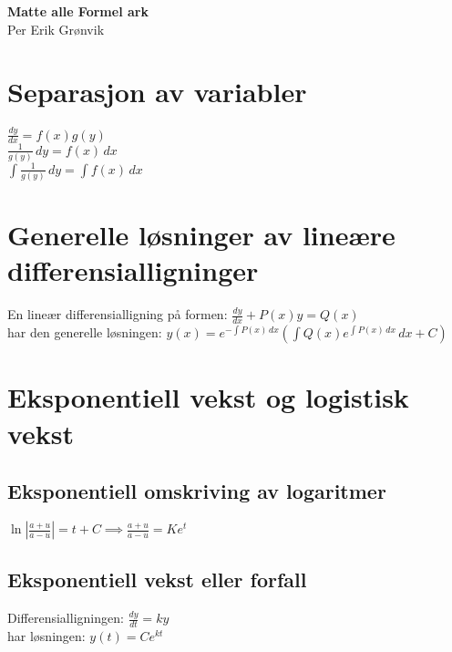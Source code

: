 \documentclass[a4paper,7pt,fleqn]{article}
\newcommand{\bodyfontsize}{\small}         %
\newcommand{\setbodyfontsize}{\bodyfontsize\selectfont}
\begin{document}
\setbodyfontsize

\begin{multicols}{3}

\begin{minipage}{\linewidth}
{\bfseries Matte alle Formel ark} \\
{\scriptsize Per Erik Grønvik }
\end{minipage}











\section{Separasjon av variabler}
\( \frac{dy}{dx} = f(x)g(y) \) \\
\( \frac{1}{g(y)} \, dy = f(x) \, dx \) \\
\( \int \frac{1}{g(y)} \, dy = \int f(x) \, dx \) \\



\section{Generelle løsninger av lineære differensialligninger}
En lineær differensialligning på formen:
\( \frac{dy}{dx} + P(x)y = Q(x) \) \\
har den generelle løsningen:
\( y(x) = e^{-\int P(x) \, dx} \left(\int Q(x) e^{\int P(x) \, dx} \, dx + C\right) \) \\

\section{Eksponentiell vekst og logistisk vekst}
\subsection{Eksponentiell omskriving av logaritmer}
\( \ln\left|\frac{a + u}{a - u}\right| = t + C \implies \frac{a + u}{a - u} = K e^{t} \) \\

\subsection{Eksponentiell vekst eller forfall}
Differensialligningen:
\( \frac{dy}{dt} = ky \) \\
har løsningen:
\( y(t) = Ce^{kt} \) \\


\end{multicols}
\end{document}
